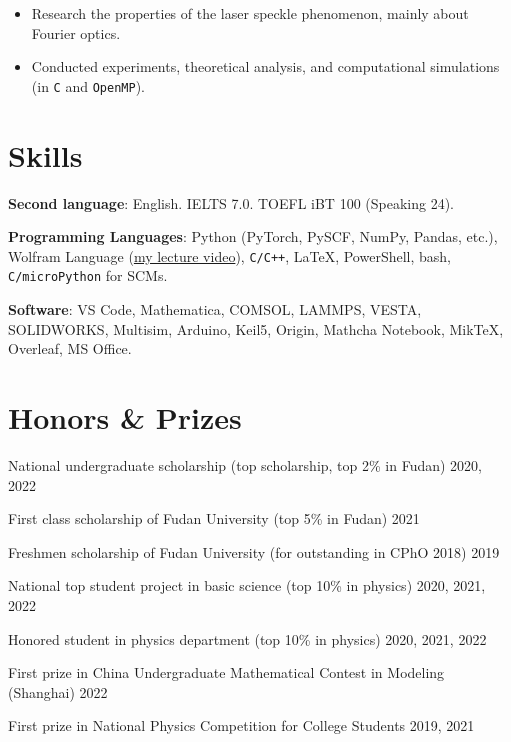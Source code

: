 \documentclass[11pt]{article} %
\begin{document}
\begin{itemize}
    \item Research the properties of the laser speckle phenomenon, mainly about Fourier optics.
    \item Conducted experiments, theoretical analysis, and computational simulations (in \verb|C| and \verb|OpenMP|).
\end{itemize}



\section*{Skills}

\textbf{Second language}: English. IELTS 7.0. TOEFL iBT 100 (Speaking 24).

\textbf{Programming Languages}:
Python (PyTorch, PySCF, NumPy, Pandas, etc.), Wolfram Language (\href{https://www.bilibili.com/video/BV1uA4y1X7tU/}{my lecture video}), \verb|C/C++|, \LaTeX, PowerShell, bash, \verb|C/microPython| for SCMs.

\textbf{Software}:
VS Code, Mathematica, COMSOL, LAMMPS, VESTA, SOLIDWORKS, Multisim, Arduino, Keil5, Origin, Mathcha Notebook, MikTeX, Overleaf, MS Office.



\section*{Honors \& Prizes}

National undergraduate scholarship (top scholarship, top 2\% in Fudan)
\hfill 2020, 2022

First class scholarship of Fudan University (top 5\% in Fudan)
\hfill 2021

Freshmen scholarship of Fudan University (for outstanding in CPhO 2018)
\hfill 2019

\vspace{2ex}

National top student project in basic science (top 10\% in physics)
\hfill 2020, 2021, 2022

Honored student in physics department (top 10\% in physics)
\hfill 2020, 2021, 2022

\vspace{2ex}

First prize in China Undergraduate Mathematical Contest in Modeling (Shanghai)
\hfill 2022

First prize in National Physics Competition for College Students
\hfill 2019, 2021
\end{document}
